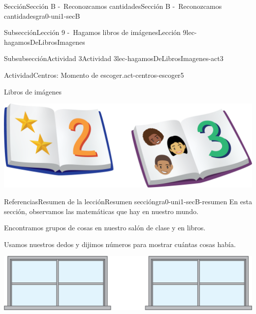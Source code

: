 \documentclass[twoside,10pt,]{article}
\begin{document}
\begin{sectionptx}{Sección}{Sección B -~Reconozcamos cantidades}{}{Sección B -~Reconozcamos cantidades}{}{}{gra0-uni1-secB}
\begin{subsectionptx}{Subsección}{Lección 9 -~Hagamos libros de imágenes}{}{Lección 9}{}{}{lec-hagamosDeLibrosImagenes}
\begin{subsubsectionptx}{Subsubsección}{Actividad 3}{}{Actividad 3}{}{}{lec-hagamosDeLibrosImagenes-act3}
\begin{activity}{Actividad}{Centros: Momento de escoger.}{act-centros-escoger5}
\begin{sidebyside}{2}{0.025}{0.025}{0.05}
\begin{sbspanel}{0.45}%
Libros de imágenes%
\par
\includegraphics[width=\linewidth]{external/png-source/K.1.D Beta Student Workbooks.Books.png}
\end{sbspanel}%
\end{sidebyside}%
\end{activity}%
\end{subsubsectionptx}
\end{subsectionptx}
%
%
\typeout{************************************************}
\typeout{************************************************}
%
\begin{references-subsection}{Referencias}{Resumen de la lección}{}{Resumen sección}{}{}{gra0-uni1-secB-resumen}
En esta sección, observamos las matemáticas que hay en nuestro mundo.%
\par
Encontramos grupos de cosas en nuestro salón de clase y en libros.%
\par
Usamos nuestros dedos y dijimos números para mostrar cuántas cosas había.%
\par
\begin{sidebyside}{2}{0.1}{0.1}{0.2}%
\begin{sbspanel}{0.5}%
\includegraphics[width=\linewidth]{external/png-source/2-windows.png}
\end{sbspanel}%
\begin{sbspanel}{0.1}%

\end{sbspanel}
\end{sidebyside}
\end{references-subsection}
\end{sectionptx}
\end{document}
